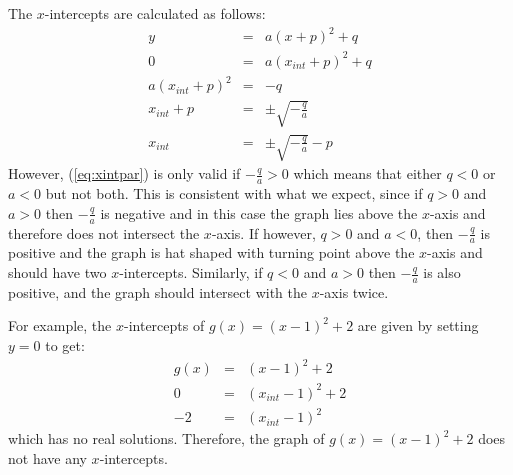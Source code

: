 The $x$-intercepts are calculated as follows:
\begin{eqnarray}
y&=&a(x+p)^2+q\\
0&=&a(x_{int}+p)^2+q\\
a(x_{int}+p)^2&=&-q\\
x_{int}+p&=&\pm \sqrt{-\frac{q}{a}}\\
\label{eq:xintpar}
x_{int}&=&\pm \sqrt{-\frac{q}{a}}-p
\end{eqnarray}
However, (\ref{eq:xintpar}) is only valid if $-\frac{q}{a}>0$ which means that either $q<0$ or $a<0$ but not both. This is consistent with what we expect, since if $q>0$ and $a>0$ then $-\frac{q}{a}$ is negative and in this case the graph lies above the $x$-axis and therefore does not intersect the $x$-axis. If however, $q>0$ and $a<0$, then $-\frac{q}{a}$ is positive and the graph is hat shaped with turning point above the $x$-axis and should have two $x$-intercepts. Similarly, if $q<0$ and $a>0$ then $-\frac{q}{a}$ is also positive, and the graph should intersect with the $x$-axis twice.

For example, the $x$-intercepts of $g(x)=(x-1)^2 + 2$ are given by setting $y=0$ to get:
\begin{eqnarray*}
g(x)&=&(x-1)^2 + 2\\
0&=&(x_{int}-1)^2 + 2\\
-2&=&(x_{int}-1)^2
\end{eqnarray*}
which has no real solutions. Therefore, the graph of $g(x)=(x-1)^2 + 2$ does not have any $x$-intercepts.


